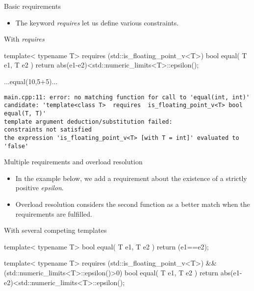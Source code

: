 \begin{frame}[fragile]
  \begin{block}{Basic requirements}
    \begin{itemize}
      \item The keyword {\it requires} let us define various constraints.
    \end{itemize}
  \end{block}
  \begin{exampleblock}{With {\it requires}}
    \scriptsize
    \begin{cppcode*}{}
    template< typename T>
    requires (std::is_floating_point_v<T>)
    bool equal( T e1, T e2 )
    { return abs(e1-e2)<std::numeric_limits<T>::epsilon(); }

    ...equal(10,5+5)...
    \end{cppcode*}
    \tiny
    \begin{verbatim}
main.cpp:11: error: no matching function for call to 'equal(int, int)'
candidate: 'template<class T>  requires  is_floating_point_v<T> bool equal(T, T)'
template argument deduction/substitution failed:
constraints not satisfied
the expression 'is_floating_point_v<T> [with T = int]' evaluated to 'false'
    \end{verbatim}
  \end{exampleblock}
\end{frame}

\begin{frame}[fragile]
  \begin{block}{Multiple requirements and overload resolution}
    \begin{itemize}
      \item In the example below, we add a requirement about the existence of a strictly positive {\it epsilon}.
      \item Overload resolution considers the second function as a better match when the requirements are fulfilled.
    \end{itemize}
  \end{block}
  \begin{exampleblock}{With several competing templates}
    \scriptsize
    \begin{cppcode*}{}
    template< typename T>
    bool equal( T e1, T e2 )
    { return (e1==e2); }

    template< typename T>
    requires (std::is_floating_point_v<T>)
          && (std::numeric_limits<T>::epsilon()>0)
    bool equal( T e1, T e2 )
    { return abs(e1-e2)<std::numeric_limits<T>::epsilon(); }
    \end{cppcode*}
  \end{exampleblock}
\end{frame}

